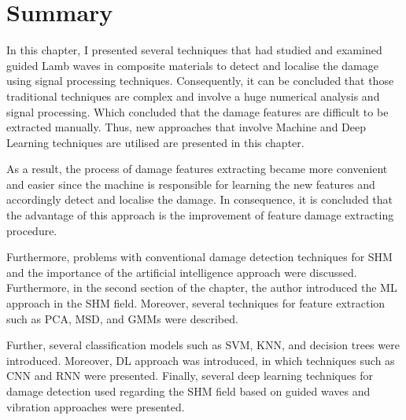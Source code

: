 \section{Summary}
\label{sec34}
In this chapter, I presented several techniques that had studied and examined guided Lamb waves in composite materials to detect and localise the damage using signal processing techniques. 
Consequently, it can be concluded that those traditional techniques are complex and involve a huge numerical analysis and signal processing. Which concluded that the damage features are difficult to be extracted manually. 
Thus, new approaches that involve Machine and Deep Learning techniques are utilised are presented in this chapter.
 
As a result, the process of damage features extracting became more convenient and easier since the machine is responsible for learning the new features and accordingly  detect and localise the damage. 
In consequence, it is concluded that the advantage of this approach is the improvement of feature damage extracting procedure.

Furthermore, problems with conventional damage detection techniques for SHM and the importance of the artificial intelligence approach were discussed.
Furthermore, in the second section of the chapter, the author introduced the ML approach in the SHM field.
Moreover, several techniques for feature extraction such as PCA, MSD, and GMMs were described. 

Further, several classification models such as SVM, KNN, and decision trees were introduced.
Moreover, DL approach was introduced, in which techniques such as CNN  and RNN were presented.
Finally, several deep learning techniques for damage detection used regarding the SHM field based on guided waves and vibration approaches were presented.